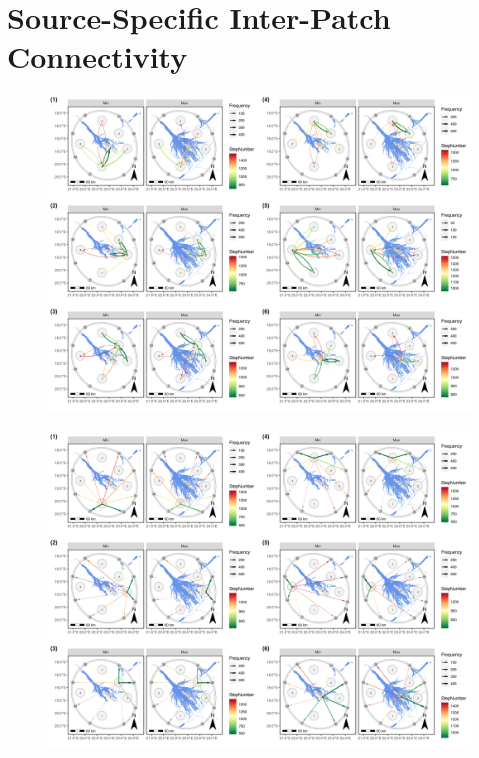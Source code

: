 \documentclass[abstract=on,10pt,a4paper,bibliography=totocnumbered]{article}
\begin{document}
\section{Source-Specific Inter-Patch Connectivity}
\begin{figure}[htbp]
  \begin{center}
  \includegraphics[width = \textwidth]{99_IPCMain.png}
  \caption{}
  \label{IPCMain}
  \end{center}
\end{figure}

\begin{figure}[htbp]
  \begin{center}
  \includegraphics[width = \textwidth]{99_IPCBuffer.png}
  \caption{}
  \label{IPCBuffer}
  \end{center}
\end{figure}


\newpage
\begingroup
\singlespacing

\endgroup
\end{document}
